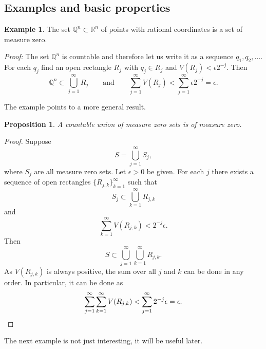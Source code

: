 \documentclass[12pt]{book}
\newcommand{\R}{{\mathbb{R}}}
\newcommand{\Q}{{\mathbb{Q}}}
\theoremstyle{plain}
\newtheorem{prop}[thm]{Proposition}
\theoremstyle{remark}
\theoremstyle{definition}
\theoremstyle{exercise}
\theoremstyle{example}
\newtheorem{example}[thm]{Example}
\begin{document}
\subsection{Examples and basic properties}

\begin{example}
The set $\Q^n \subset \R^n$ of points with rational coordinates
is a set of measure zero.

\emph{Proof:}
The set $\Q^n$ is countable and therefore let us write it
as a sequence $q_1,q_2,\ldots$.  For each $q_j$ find an open rectangle
$R_j$ with $q_j \in R_j$ and $V(R_j) < \epsilon 2^{-j}$.  Then
\begin{equation*}
\Q^n \subset \bigcup_{j=1}^\infty R_j \qquad \text{and} \qquad
\sum_{j=1}^\infty V(R_j) <
\sum_{j=1}^\infty \epsilon 2^{-j} = \epsilon .
\end{equation*}
\end{example}

The example points to a more general result.

\begin{prop}
A countable union of measure zero sets is of measure zero.
\end{prop}

\begin{proof}
Suppose
\begin{equation*}
S = \bigcup_{j=1}^\infty S_j ,
\end{equation*}
where $S_j$ are all measure zero sets.  Let $\epsilon > 0$ be given.
For each $j$
there exists a sequence of open rectangles $\{ R_{j,k} \}_{k=1}^\infty$
such that
\begin{equation*}
S_j \subset \bigcup_{k=1}^\infty R_{j,k}
\end{equation*}
and 
\begin{equation*}
\sum_{k=1}^\infty V(R_{j,k}) < 2^{-j} \epsilon .
\end{equation*}
Then
\begin{equation*}
S \subset \bigcup_{j=1}^\infty \bigcup_{k=1}^\infty R_{j,k} .
\end{equation*}
As $V(R_{j,k})$ is always positive, the sum over all $j$ and $k$
can be done in any order.  In particular, it can be done as
\begin{equation*}
\sum_{j=1}^\infty \sum_{k=1}^\infty V(R_{j,k}) <
\sum_{j=1}^\infty 2^{-j} \epsilon = \epsilon . \qedhere
\end{equation*}
\end{proof}

The next example is not just interesting, it will be useful later.
\end{document}
